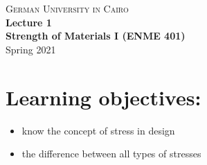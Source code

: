 \documentclass[11pt]{article}
\theoremstyle{definition}
\begin{document}
\setcounter{section}{0}
\title{}

\thispagestyle{empty}
\begin{center}
\textsc{\LARGE German University in Cairo}\\[1.0cm]
{\LARGE \bf Lecture 1}\\ [0.5cm]
{\large \bf Strength of Materials I (ENME 401)}\\ [0.5cm]
Spring 2021
\end{center}
\tableofcontents
\newcommand{\incfig}[2][1]{%
    \def\svgwidth{#1\columnwidth}
    {#2.pdf_tex}
}
\section*{Learning objectives:}
\begin{itemize}

\item know the concept of stress in design 
\item the difference between all types of stresses

\end{itemize}
\end{document}
